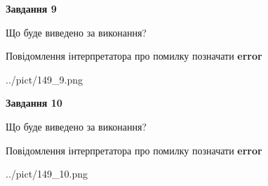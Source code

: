 \documentclass[12pt, ukrainian]{article}
\begin{document}
{{\begin {center}\textbf{Завдання 9}\end {center}}\par
Що буде виведено за виконання? \par
Повідомлення інтерпретатора про помилку позначати \textbf{error}

\begin{center}
	{../pict/149_9.png}
\end{center}
\newpage

{\begin {center}\textbf{Завдання 10}\end {center}}\par
Що буде виведено за виконання? \par
Повідомлення інтерпретатора про помилку позначати \textbf{error}

\begin{center}
	{../pict/149_10.png}
\end{center}
\newpage

}
\end{document}
